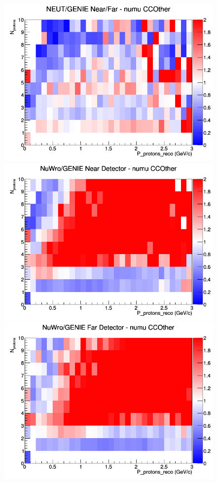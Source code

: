\begin{figure}[h]
\endminipage
{}
\includegraphics[width=\linewidth]{eff_N_P/GAr/protons/ratios/CCOther_NEUT_GENIE_numu_NF_N_P.png}
\endminipage
\newline
{}
\includegraphics[width=\linewidth]{eff_N_P/GAr/protons/ratios/CCOther_NuWro_GENIE_numu_near_N_P.png}
\endminipage
{}
\includegraphics[width=\linewidth]{eff_N_P/GAr/protons/ratios/CCOther_NuWro_GENIE_numu_far_N_P.png}

\end{figure}
